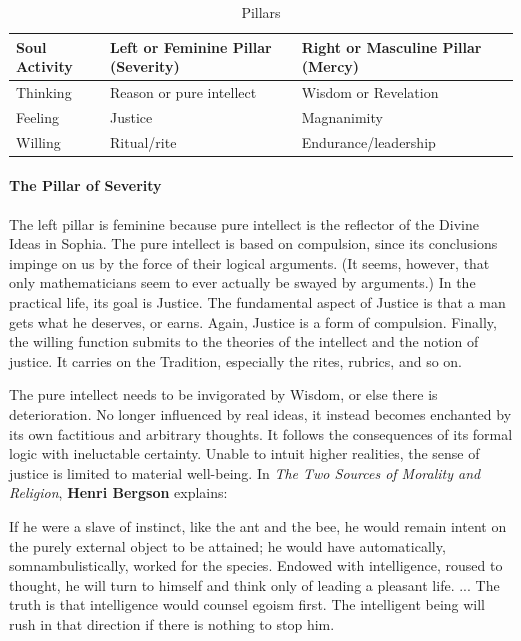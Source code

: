 \begin{table}[h]\centering\small
\begin{tabular}{p{}p{}p{}}\toprule
\textbf{Soul Activity} & \textbf{Left or Feminine Pillar (Severity)} & \textbf{Right or Masculine Pillar (Mercy)} \\\midrule
Thinking & Reason or pure intellect & Wisdom or Revelation \\
Feeling & Justice & Magnanimity \\
Willing & Ritual/rite & Endurance/leadership \\\bottomrule
\end{tabular}
\caption{Pillars}
\label{tab:pillars}
\end{table}

\paragraph{The Pillar of Severity}


The left pillar is feminine because pure intellect is the reflector of the Divine Ideas in Sophia. The pure intellect is based on compulsion, since its conclusions impinge on us by the force of their logical arguments. (It seems, however, that only mathematicians seem to ever actually be swayed by arguments.) In the practical life, its goal is Justice. The fundamental aspect of Justice is that a man gets what he deserves, or earns. Again, Justice is a form of compulsion. Finally, the willing function submits to the theories of the intellect and the notion of justice. It carries on the Tradition, especially the rites, rubrics, and so on.

The pure intellect needs to be invigorated by Wisdom, or else there is deterioration. No longer influenced by real ideas, it instead becomes enchanted by its own factitious and arbitrary thoughts. It follows the consequences of its formal logic with ineluctable certainty. Unable to intuit higher realities, the sense of justice is limited to material well-being. In \emph{The Two Sources of Morality and Religion}, \textbf{Henri Bergson} explains:

\begin{quotex}
If he were a slave of instinct, like the ant and the bee, he would remain intent on the purely external object to be attained; he would have automatically, somnambulistically, worked for the species. Endowed with intelligence, roused to thought, he will turn to himself and think only of leading a pleasant life. ... The truth is that intelligence would counsel egoism first. The intelligent being will rush in that direction if there is nothing to stop him.
\end{quotex}


